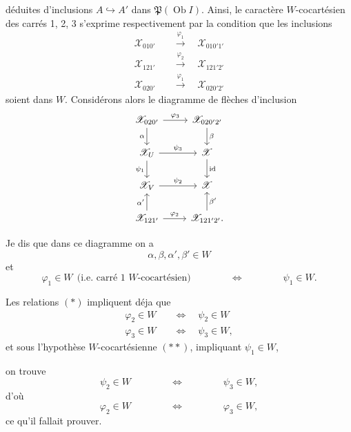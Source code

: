 \documentclass[11pt]{article}
\newcommand{\printedpage}[1]{\marginpar{\footnotesize p.~#1}}
\newcommand{\msp}[1]{\marginpar{\footnotesize [#1]}}
\newcommand{\cX}{\mathscr{X}}
\newcommand{\Ob}{\operatorname{Ob}}
\begin{document}
\msp{page 237}

déduites d'inclusions $A \hookrightarrow A'$ dans $\mathfrak{P}(\Ob I)$. Ainsi, le caractère $W$-cocartésien des carrés 1, 2, 3 s'exprime respectivement par la condition que les inclusions
\[
\begin{aligned}
\cX_{010'} \quad &\xrightarrow{\varphi_1} \quad \cX_{010'1'} \\
\cX_{121'} \quad &\xrightarrow{\varphi_2} \quad \cX_{121'2'} \\
\cX_{020'} \quad &\xrightarrow{\varphi_1} \quad \cX_{020'2'} %
\end{aligned}
\]
soient dans $W$. Considérons alors le diagramme de flèches d'inclusion
\printedpage{153}
\[
\begin{tikzcd}[ampersand replacement=\&]
\cX_{020'} \arrow[r, "\varphi_3"] \arrow[d, "\alpha"'] \& \cX_{020'2'} \arrow[d, "\beta"] \\
\cX_U \arrow[r, "\psi_3"] \arrow[d, "\psi_1"'] \& \cX \arrow[d, "\mathrm{id}"] \\
\cX_V \arrow[r, "\psi_2"] \& \cX \\
\cX_{121'} \arrow[r, "\varphi_2"] \arrow[u, "\alpha'"] \& \cX_{121'2'}. \arrow[u, "\beta'"']
\end{tikzcd}
\]

Je dis que dans ce diagramme on a
\[
\alpha, \beta, \alpha', \beta' \in W
\tag*{$(\ast)$}
\]
et
\[
\varphi_1 \in W \ \ \text{(i.e. carré 1 $W$-cocartésien)} \qquad\qquad \Longleftrightarrow \qquad\qquad \psi_1 \in W.
\tag*{$(\ast\ast)$}
\]

Les relations $(\ast)$ impliquent déja que %
\[
\begin{aligned}
\varphi_2 \in W \quad &\Longleftrightarrow \quad \psi_2 \in W \\
\varphi_3 \in W \quad &\Longleftrightarrow \quad \psi_3 \in W,
\end{aligned}
\]
et sous l'hypothèse $W$-cocartésienne $(\ast\ast)$, impliquant $\psi_1 \in W$,

\msp{page 238}

on trouve
\[
\psi_2 \in W \qquad\qquad \Longleftrightarrow \qquad\qquad \psi_3 \in W,
\]
d'où
\[
\varphi_2 \in W \qquad\qquad \Longleftrightarrow \qquad\qquad \varphi_3 \in W,
\]
ce qu'il fallait prouver.
\end{document}
